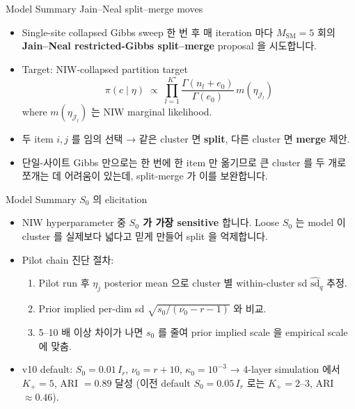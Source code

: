 \documentclass{beamer}
\begin{document}
\begin{frame}{Model Summary}
{Jain--Neal split--merge moves}

\begin{itemize}
    \item Single-site collapsed Gibbs sweep 한 번 후 매 iteration 마다 $M_{\mathrm{SM}} = 5$ 회의 \textbf{Jain--Neal restricted-Gibbs split--merge} proposal 을 시도합니다.
    \item Target: NIW-collapsed partition target
    \[
        \pi(c \mid \eta) \;\propto\; \prod_{l=1}^{K^\star} \frac{\Gamma(n_l + e_0)}{\Gamma(e_0)} \, m(\eta_{\mathcal{J}_l})
    \]
    where $m(\eta_{\mathcal{J}_l})$ 는 NIW marginal likelihood.
    \item 두 item $i,j$ 를 임의 선택 → 같은 cluster 면 \textbf{split}, 다른 cluster 면 \textbf{merge} 제안.
    \item 단일-사이트 Gibbs 만으로는 한 번에 한 item 만 옮기므로 큰 cluster 를 두 개로 쪼개는 데 어려움이 있는데, split-merge 가 이를 보완합니다.
\end{itemize}
\end{frame}

\begin{frame}{Model Summary}
{$S_0$ 의 elicitation}

\begin{itemize}
    \item NIW hyperparameter 중 \textbf{$S_0$ 가 가장 sensitive} 합니다. Loose $S_0$ 는 model 이 cluster 를 실제보다 넓다고 믿게 만들어 split 을 억제합니다.
    \item Pilot chain 진단 절차:
    \begin{enumerate}
        \item Pilot run 후 $\eta_j$ posterior mean 으로 cluster 별 within-cluster sd $\widehat{\mathrm{sd}}_q$ 추정.
        \item Prior implied per-dim sd $\sqrt{s_0/(\nu_0 - r - 1)}$ 와 비교.
        \item 5--10 배 이상 차이가 나면 $s_0$ 를 줄여 prior implied scale 을 empirical scale 에 맞춤.
    \end{enumerate}
    \item v10 default: $S_0 = 0.01\, I_r$, $\nu_0 = r + 10$, $\kappa_0 = 10^{-3}$ → 4-layer simulation 에서 $K_+ = 5$, ARI $= 0.89$ 달성 (이전 default $S_0 = 0.05\, I_r$ 로는 $K_+ = 2$--$3$, ARI $\approx 0.46$).
\end{itemize}
\end{frame}
\end{document}
